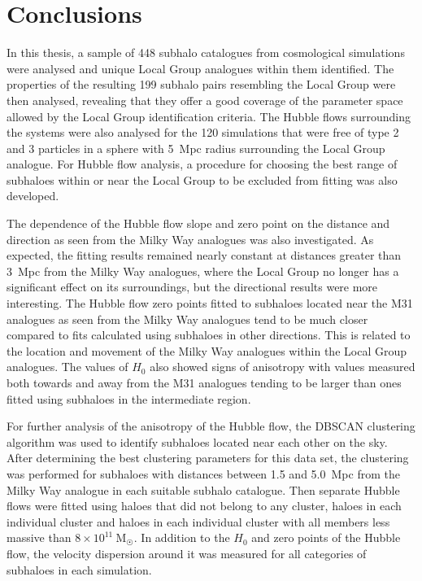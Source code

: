 \documentclass[english, twoside]{HYgradu}
\begin{document}
\chapter{Conclusions}
In this thesis, a sample of 448 subhalo catalogues from cosmological simulations were analysed and unique Local Group analogues within them identified. The properties of the resulting 199 subhalo pairs resembling the Local Group were then analysed, revealing that they offer a good coverage of the parameter space allowed by the Local Group identification criteria. The Hubble flows surrounding the systems were also analysed for the 120 simulations that were free of type 2 and 3 particles in a sphere with 5~Mpc radius surrounding the Local Group analogue. For Hubble flow analysis, a procedure for choosing the best range of subhaloes within or near the Local Group to be excluded from fitting was also developed.

The dependence of the Hubble flow slope and zero point on the distance and direction as seen from the Milky Way analogues was also investigated. As expected, the fitting results remained nearly constant at distances greater than 3~Mpc from the Milky Way analogues, where the Local Group no longer has a significant effect on its surroundings, but the directional results were more interesting. The Hubble flow zero points fitted to subhaloes located near the M31 analogues as seen from the Milky Way analogues tend to be much closer compared to fits calculated using subhaloes in other directions. This is related to the location and movement of the Milky Way analogues within the Local Group analogues. The values of $H_0$ also showed signs of anisotropy with values measured both towards and away from the M31 analogues tending to be larger than ones fitted using subhaloes in the intermediate region.

For further analysis of the anisotropy of the Hubble flow, the DBSCAN clustering algorithm was used to identify subhaloes located near each other on the sky. After determining the best clustering parameters for this data set, the clustering was performed for subhaloes with distances between 1.5 and 5.0~Mpc from the Milky Way analogue in each suitable subhalo catalogue. Then separate Hubble flows were fitted using haloes that did not belong to any cluster, haloes in each individual cluster and haloes in each individual cluster with all members less massive than $8 \times 10^{11}\ \mathrm{M}_{\astrosun}$. In addition to the $H_0$ and zero points of the Hubble flow, the velocity dispersion around it was measured for all categories of subhaloes in each simulation.
\end{document}
